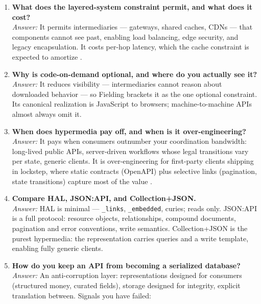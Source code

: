 \begin{enumerate}[label=\textbf{Q\arabic*.}, leftmargin=3.2em, itemsep=0.6em, resume]
  \item \textbf{What does the layered-system constraint permit, and what does
        it cost?}\\
        \emph{Answer:} It permits intermediaries --- gateways, shared caches,
        CDNs --- that components cannot see past, enabling load balancing,
        edge security, and legacy encapsulation. It costs per-hop latency,
        which the cache constraint is expected to amortize
        \cite{fielding2000rest}.
  \item \textbf{Why is code-on-demand optional, and where do you actually see
        it?}\\
        \emph{Answer:} It reduces visibility --- intermediaries cannot reason
        about downloaded behavior --- so Fielding brackets it as the one
        optional constraint. Its canonical realization is JavaScript to
        browsers; machine-to-machine APIs almost always omit it.
  \item \textbf{When does hypermedia pay off, and when is it over-engineering?}\\
        \emph{Answer:} It pays when consumers outnumber your coordination
        bandwidth: long-lived public APIs, server-driven workflows whose legal
        transitions vary per state, generic clients. It is over-engineering for
        first-party clients shipping in lockstep, where static contracts
        (OpenAPI) plus selective links (pagination, state transitions) capture
        most of the value \cite{richardson2013restful}.
  \item \textbf{Compare HAL, JSON:API, and Collection+JSON.}\\
        \emph{Answer:} HAL is minimal --- \texttt{\_links},
        \texttt{\_embedded}, curies; reads only. JSON:API is a full protocol:
        resource objects, relationships, compound documents, pagination and
        error conventions, write semantics. Collection+JSON is the purest
        hypermedia: the representation carries queries and a write template,
        enabling fully generic clients.
  \item \textbf{How do you keep an API from becoming a serialized database?}\\
        \emph{Answer:} An anti-corruption layer: representations designed for
        consumers (structured money, curated fields), storage designed for
        integrity, explicit translation between. Signals you have failed:

\end{enumerate}

